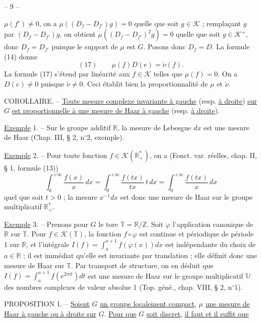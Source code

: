 \begin{center}-- 9 --\end{center}
$\mu(f')\ne0$, on a $\mu((D_f-D_{f'})g)=0$ quelle que soit $g\in\mathcal K$ ;
remplaçant $g$ par $(D_f-D_{f'})g$, on obtient
$\mu((D_f-D_{f'})^2g)=0$ quelle que soit $g\in\mathcal K^+$,
donc $D_f=D_{f'}$ puisque le support de $\mu$ est $G$.
Posons donc $D_f=D$. La formule (14) donne
\[
(17)\qquad \mu(f)D(e)=\check\nu(f).
\]
La formule (17) s’étend par linéarité aux $f\in\mathcal K$ telles que $\mu(f)=0$.
On a $D(e)\ne0$ puisque $\check\nu\ne0$.
Ceci établit bien la proportionnalité de $\mu$ et $\check\nu$.

COROLLAIRE. -- \uline{Toute mesure complexe invariante à gauche}
(resp. \uline{à droite}) \uline{sur} $G$
\uline{est proportionnelle à une mesure de Haar à gauche}
(resp. \uline{à droite}).

\uline{Exemple} 1. -- Sur le groupe additif $\mathbb R$, la mesure de Lebesgue $dx$
est une mesure de Haar (Chap. III, § 2, n$^\circ$2, exemple).

\uline{Exemple} 2. -- Pour toute fonction $f\in\mathcal K(\mathbb R_+^*)$,
on a (Fonct. var. réelles, chap. II, § 1, formule (13))
\[
\int_0^{+\infty}\frac{f(x)}x\,dx
=\int_0^{+\infty}\frac{f(tx)}{tx}\,t\,dx
=\int_0^{+\infty}\frac{f(tx)}x\,dx
\]
quel que soit $t>0$ ; la mesure $x^{-1}dx$ est donc une mesure de Haar
sur le groupe multiplicatif $\mathbb R_+^*$.

\uline{Exemple} 3. -- Prenons pour $G$ le tore $\mathbb T=\mathbb R/\mathbb Z$.
Soit $\varphi$ l’application canonique de $\mathbb R$ sur $\mathbb T$.
Pour $f\in\mathcal K(\mathbb T)$, la fonction $f\circ\varphi$ est continue et
périodique de période 1 sur $\mathbb R$, et l’intégrale
$I(f)=\int_a^{a+1}f(\varphi(x))dx$ est indépendante du choix de $a\in\mathbb R$ ;
il est immédiat qu’elle est invariante par translation ; elle définit donc
une mesure de Haar sur $\mathbb T$. Par transport de structure, on en déduit que
$I(f)=\int_a^{a+1}f(e^{2\pi it})dt$ est une mesure de Haar sur le groupe
multiplicatif $\mathbb U$ des nombres complexes de valeur absolue 1
(Top. géné., chap. VIII, § 2, n$^\circ$1).

PROPOSITION 1. -- \uline{Soient} $G$ \uline{un groupe localement compact},
$\mu$ \uline{une mesure de Haar à gauche ou à droite sur} $G$.
\uline{Pour que} $G$ \uline{soit discret}, \uline{il faut et il suffit que}
